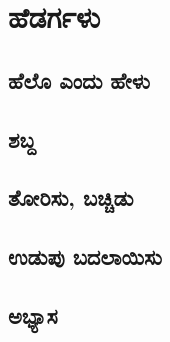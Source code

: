 \chapter{ಹೆಡರ್ಗಳು}

\section{ಹೆಲೊ ಎಂದು ಹೇಳು }

\section{ಶಬ್ದ }
\SampleProgram

\section{ತೋರಿಸು, ಬಚ್ಚಿಡು}

\section{ಉಡುಪು ಬದಲಾಯಿಸು}

\section{ಅಭ್ಯಾಸ }